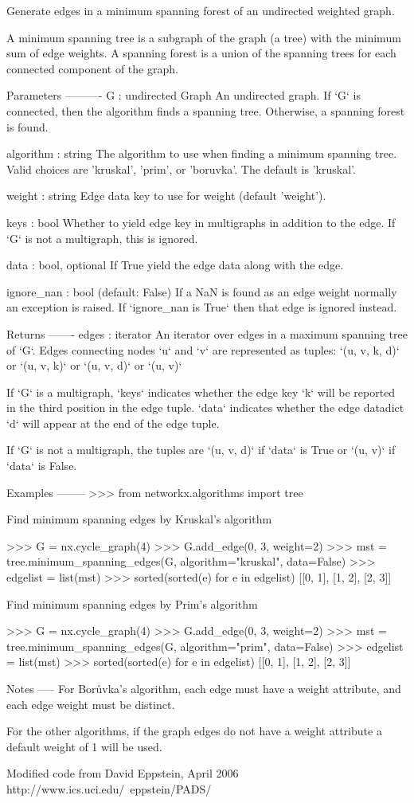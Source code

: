 \begin{DoxyVerb}Generate edges in a minimum spanning forest of an undirected
weighted graph.

A minimum spanning tree is a subgraph of the graph (a tree)
with the minimum sum of edge weights.  A spanning forest is a
union of the spanning trees for each connected component of the graph.

Parameters
----------
G : undirected Graph
   An undirected graph. If `G` is connected, then the algorithm finds a
   spanning tree. Otherwise, a spanning forest is found.

algorithm : string
   The algorithm to use when finding a minimum spanning tree. Valid
   choices are 'kruskal', 'prim', or 'boruvka'. The default is 'kruskal'.

weight : string
   Edge data key to use for weight (default 'weight').

keys : bool
   Whether to yield edge key in multigraphs in addition to the edge.
   If `G` is not a multigraph, this is ignored.

data : bool, optional
   If True yield the edge data along with the edge.

ignore_nan : bool (default: False)
    If a NaN is found as an edge weight normally an exception is raised.
    If `ignore_nan is True` then that edge is ignored instead.

Returns
-------
edges : iterator
   An iterator over edges in a maximum spanning tree of `G`.
   Edges connecting nodes `u` and `v` are represented as tuples:
   `(u, v, k, d)` or `(u, v, k)` or `(u, v, d)` or `(u, v)`

   If `G` is a multigraph, `keys` indicates whether the edge key `k` will
   be reported in the third position in the edge tuple. `data` indicates
   whether the edge datadict `d` will appear at the end of the edge tuple.

   If `G` is not a multigraph, the tuples are `(u, v, d)` if `data` is True
   or `(u, v)` if `data` is False.

Examples
--------
>>> from networkx.algorithms import tree

Find minimum spanning edges by Kruskal's algorithm

>>> G = nx.cycle_graph(4)
>>> G.add_edge(0, 3, weight=2)
>>> mst = tree.minimum_spanning_edges(G, algorithm="kruskal", data=False)
>>> edgelist = list(mst)
>>> sorted(sorted(e) for e in edgelist)
[[0, 1], [1, 2], [2, 3]]

Find minimum spanning edges by Prim's algorithm

>>> G = nx.cycle_graph(4)
>>> G.add_edge(0, 3, weight=2)
>>> mst = tree.minimum_spanning_edges(G, algorithm="prim", data=False)
>>> edgelist = list(mst)
>>> sorted(sorted(e) for e in edgelist)
[[0, 1], [1, 2], [2, 3]]

Notes
-----
For Borůvka's algorithm, each edge must have a weight attribute, and
each edge weight must be distinct.

For the other algorithms, if the graph edges do not have a weight
attribute a default weight of 1 will be used.

Modified code from David Eppstein, April 2006
http://www.ics.uci.edu/~eppstein/PADS/\end{DoxyVerb}
